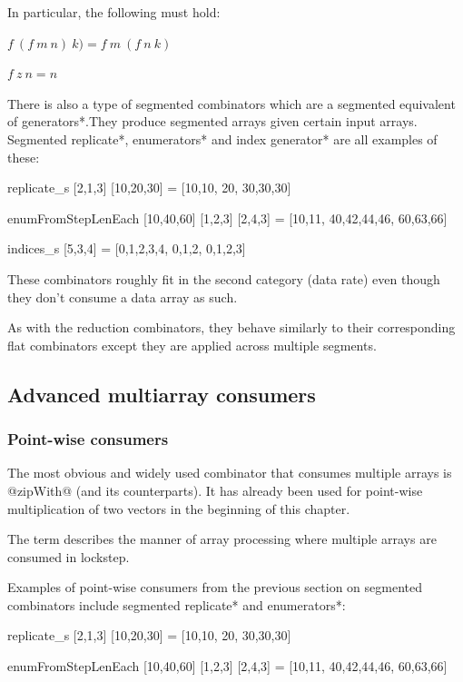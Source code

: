 \documentclass[preamble.tex]{subfiles}
\begin{document}
In particular, the following must hold:

$f\ (f\ m\ n)\ k) = f\ m\ (f\ n\ k)$

$f\ z\ n = n$

There is also a type of segmented combinators which are a segmented equivalent of \*generators*.\igencomb They produce segmented arrays given certain input arrays. \*Segmented replicate*, \*enumerators* and \*index generator* are all examples of these:

\begin{hscode}
replicate_s [2,1,3] [10,20,30] = [10,10, 20, 30,30,30]

enumFromStepLenEach [10,40,60] [1,2,3] [2,4,3]
  = [10,11, 40,42,44,46, 60,63,66]

indices_s [5,3,4] = [0,1,2,3,4, 0,1,2, 0,1,2,3]
\end{hscode}

These combinators roughly fit in the second category (data rate) even though they don't consume a data array as such.

As with the reduction combinators, they behave similarly to their corresponding flat combinators except they are applied across multiple segments.


\subsection{Advanced multiarray consumers}

\subsubsection{Point-wise consumers}
\label{sec:DPH-pointwise-consumers}

The most obvious and widely used combinator that consumes multiple arrays is @zipWith@ (and its  counterparts). It has already been used for point-wise multiplication of two vectors in the beginning of this chapter.

The term  describes the manner of array processing where multiple arrays are consumed in lockstep.

Examples of point-wise consumers from the previous section on segmented combinators include \*segmented replicate* and \*enumerators*:

\begin{hscode}
replicate_s [2,1,3] [10,20,30] = [10,10, 20, 30,30,30]

enumFromStepLenEach [10,40,60] [1,2,3] [2,4,3]
  = [10,11, 40,42,44,46, 60,63,66]
\end{hscode}
\end{document}
